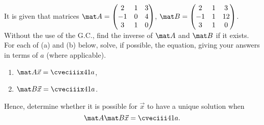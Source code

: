 \begin{problem}
    It is given that matrices $\mat A = \begin{pmatrix}2 & 1 & 3  \\ -1 & 0 & 4 \\ 3 & 1 & 0\end{pmatrix}$, $\mat B = \begin{pmatrix} 2 & 1 & 3 \\ -1 & 1 & 12 \\ 3 & 1 & 0 \end{pmatrix}$. Without the use of the G.C., find the inverse of $\mat A$ and $\mat B$ if it exists. For each of (a) and (b) below, solve, if possible, the equation, giving your answers in terms of $a$ (where applicable).

    \begin{enumerate}
        \item $\mat A \vec x = \cveciiix41a$,
        \item $\mat B \vec x = \cveciiix41a$.
    \end{enumerate}

    Hence, determine whether it is possible for $\vec x$ to have a unique solution when \[\mat A \mat B \vec x = \cveciii41a.\]
\end{problem}

